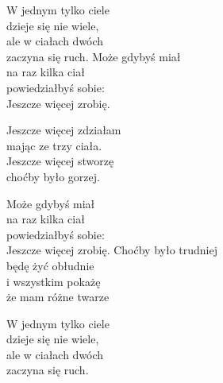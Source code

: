 \begin{text}
    W jednym tylko ciele\\
    dzieje się nie wiele,\\
    ale w ciałach dwóch\\
    zaczyna się ruch.
    \vin Może gdybyś miał\\
    \vin na raz kilka ciał\\
    \vin powiedziałbyś sobie:\\
    \vin Jeszcze więcej zrobię.

    \vin Jeszcze więcej zdziałam\\
    \vin mając ze trzy ciała.\\
    \vin Jeszcze więcej stworzę\\
    \vin choćby było gorzej.

    Może gdybyś miał\\
    na raz kilka ciał\\
    powiedziałbyś sobie:\\
    Jeszcze więcej zrobię.
    \vin Choćby było trudniej\\
    \vin będę żyć obłudnie\\
    \vin i wszystkim pokażę\\
    \vin że mam różne twarze

    W jednym tylko ciele\\
    dzieje się nie wiele,\\
    ale w ciałach dwóch\\
    zaczyna się ruch.
\end{text}
\begin{chord}

\end{chord}